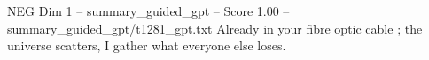 \begin{textsample}{NEG Dim 1 – summary\_guided\_gpt – Score 1.00 – summary\_guided\_gpt/t1281\_gpt.txt}  \label{ex:f1_neg_028}
Already in your fibre optic cable ; the universe scatters, I gather what everyone else loses.

\end{textsample}
